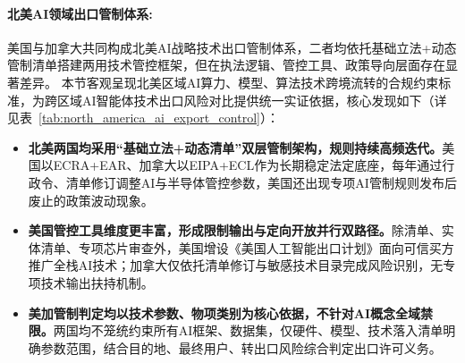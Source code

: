 \begin{center}
\paragraph{北美AI领域出口管制体系:}
美国与加拿大共同构成北美AI战略技术出口管制体系，二者均依托基础立法+动态管制清单搭建两用技术管控框架，但在执法逻辑、管控工具、政策导向层面存在显著差异。
本节客观呈现北美区域AI算力、模型、算法技术跨境流转的合规约束标准，为跨区域AI智能体技术出口风险对比提供统一实证依据，核心发现如下（详见表~\ref{tab:north_america_ai_export_control}）：
\begin{itemize}[tabitem]
    \item \textbf{北美两国均采用“基础立法+动态清单”双层管制架构，规则持续高频迭代。}美国以ECRA+EAR、加拿大以EIPA+ECL作为长期稳定法定底座，每年通过行政令、清单修订调整AI与半导体管控参数，美国还出现专项AI管制规则发布后废止的政策波动现象。
    \item \textbf{美国管控工具维度更丰富，形成限制输出与定向开放并行双路径。}除清单、实体清单、专项芯片审查外，美国增设《美国人工智能出口计划》面向可信买方推广全栈AI技术；加拿大仅依托清单修订与敏感技术目录完成风险识别，无专项技术输出扶持机制。
    \item \textbf{美加管制判定均以技术参数、物项类别为核心依据，不针对AI概念全域禁限。}两国均不笼统约束所有AI框架、数据集，仅硬件、模型、技术落入清单明确参数范围，结合目的地、最终用户、转出口风险综合判定出口许可义务。
\end{itemize}




\end{center}
